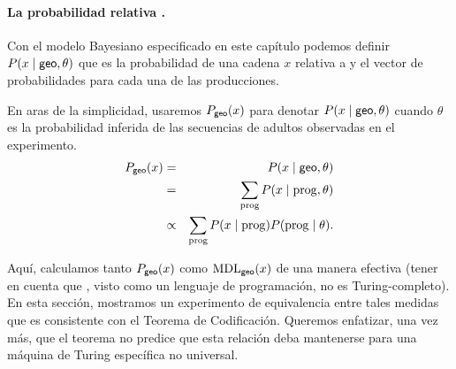 \paragraph{La probabilidad relativa \gramgeo.} 

Con el modelo Bayesiano especificado en este capítulo podemos definir $P(x \mid {\sf geo}, \theta)$ que es la probabilidad de una cadena $x$ relativa a \gramgeo y el vector de probabilidades para cada una de las producciones.

En aras de la simplicidad, usaremos $P_{{\sf geo}}(x)$ para denotar $P(x \mid {\sf geo}, \theta)$ cuando $\theta$ es la probabilidad inferida de las secuencias de adultos observadas en el experimento.
%
\begin{eqnarray*}
\label{eqG}
P_{{\sf geo}}(x) &=& P(x \mid {\sf geo}, \theta)\\
&=& \sum_{{\rm prog}} P(x \mid {\rm prog}, \theta)\\
&\propto &\sum_{{\rm prog}} P(x \mid {\rm prog}) P({\rm prog} \mid \theta).
\end{eqnarray*}
%


Aquí, calculamos tanto $P_{{\sf geo}}(x)$ como ${\rm MDL}_{{\sf geo}}(x)$ de una manera efectiva (tener en cuenta que \gramgeo, visto como un lenguaje de programación, no es Turing-completo). En esta sección, mostramos un experimento de equivalencia entre tales medidas que es consistente con el Teorema de Codificación. Queremos enfatizar, una vez más, que el teorema no predice que esta relación deba mantenerse para una máquina de Turing específica no universal.



